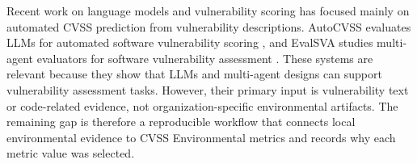 Recent work on language models and vulnerability scoring has focused mainly on automated CVSS prediction from vulnerability descriptions. AutoCVSS evaluates LLMs for automated software vulnerability scoring \cite{sanvito2025autocvss}, and EvalSVA studies multi-agent evaluators for software vulnerability assessment \cite{wen2025evalsva}. These systems are relevant because they show that LLMs and multi-agent designs can support vulnerability assessment tasks. However, their primary input is vulnerability text or code-related evidence, not organization-specific environmental artifacts. The remaining gap is therefore a reproducible workflow that connects local environmental evidence to CVSS Environmental metrics and records why each metric value was selected.
